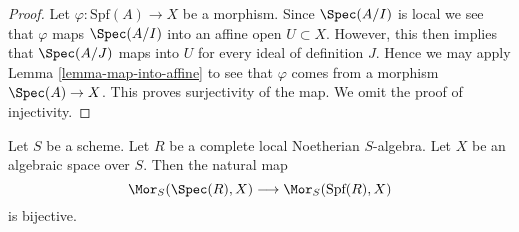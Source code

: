 \begin{proof}
Let $\varphi : \text{Spf}(A) \to X$ be a morphism. Since $\Spec(A/I)$
is local we see that $\varphi$ maps $\Spec(A/I)$ into an affine
open $U \subset X$. However, this then implies that $\Spec(A/J)$
maps into $U$ for every ideal of definition $J$. Hence we may
apply Lemma \ref{lemma-map-into-affine} to see that $\varphi$ comes
from a morphism $\Spec(A) \to X$. This proves surjectivity of the map.
We omit the proof of injectivity.
\end{proof}

\begin{lemma}
\label{lemma-map-into-algebraic-space}
Let $S$ be a scheme. Let $R$ be a complete local Noetherian $S$-algebra.
Let $X$ be an algebraic space over $S$. Then the natural map
$$
\Mor_S(\Spec(R), X)
\longrightarrow
\Mor_S(\text{Spf}(R), X)
$$
is bijective.
\end{lemma}

